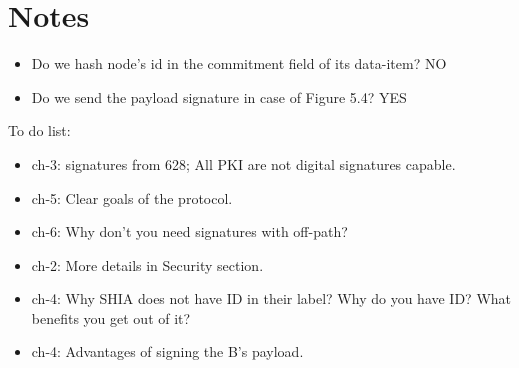 \chapter{Notes}

\begin{itemize}
	\item Do we hash node's id in the commitment field of its data-item? NO
	\item Do we send the payload signature in case of Figure 5.4? YES
\end{itemize}

To do list:
\begin{itemize}
	\item ch-3: signatures from 628; All PKI are not digital signatures capable.
	\item ch-5: Clear goals of the protocol.
	\item ch-6: Why don't you need signatures with off-path?
	\item ch-2: More details in Security section.
	\item ch-4: Why SHIA does not have ID in their label? Why do you have ID? What benefits you get out of it?
	\item ch-4: Advantages of signing the B's payload.

\end{itemize}
